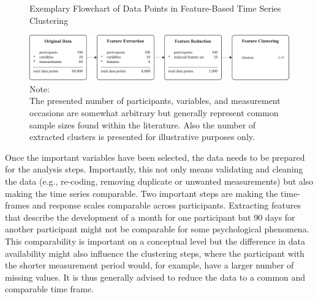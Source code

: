 \documentclass[man, 12pt, a4paper, mask, floatsintext]{apa7}
\theoremstyle{break}
\theoremstyle{plain}
\begin{document}
\begin{figure}[!ht] %
  \caption{Exemplary Flowchart of Data Points in Feature-Based Time Series Clustering}
  \label{fig:TSCFlowN}
  \centering\includegraphics[width=\textwidth]{figures/TS Cluster Flow/tsClustFlowN.pdf}
  \caption*{Note: \\
  The presented number of participants, variables, and measurement occasions are somewhat arbitrary but generally represent common sample sizes found within the literature. Also the number of extracted clusters is presented for illustrative purposes only.}
\end{figure}

Once the important variables have been selected, the data needs to be prepared for the analysis steps. Importantly, this not only means validating and cleaning the data (e.g., re-coding, removing duplicate or unwanted measurements) but also making the time series comparable. Two important steps are making the time-frames and response scales comparable across participants. Extracting features that describe the development of a month for one participant but 90 days for another participant might not be comparable for some psychological phenomena. This comparability is important on a conceptual level but the difference in data availability might also influence the clustering steps, where the participant with the shorter measurement period would, for example, have a larger number of missing values. It is thus generally advised to reduce the data to a common and comparable time frame. 
\end{document}
